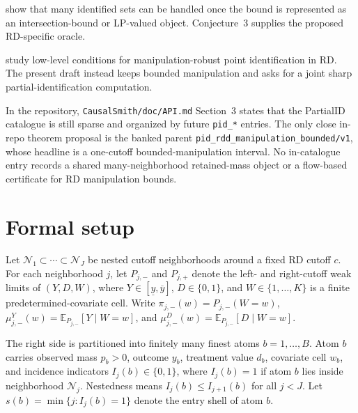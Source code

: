 \documentclass[11pt]{article}
\newcommand{\E}{\mathbb{E}}
\theoremstyle{definition}
\theoremstyle{plain}
\theoremstyle{remark}
\begin{document}
\citet[Abstract; p.~667]{chernozhukov_lee_rosen_2013_intersection_bounds} show that many
identified sets can be handled once the bound is represented as an intersection-bound or LP-valued
object. Conjecture~3 supplies the proposed RD-specific oracle.

\citet{ishihara_sawada_2024_manipulation_robust} study low-level conditions for manipulation-robust
point identification in RD. The present draft instead keeps bounded manipulation and asks for a
joint sharp partial-identification computation.

In the repository, \texttt{CausalSmith/doc/API.md} Section~3 states that the PartialID catalogue
is still sparse and organized by future \texttt{pid\_*} entries. The only close in-repo theorem
proposal is the banked parent \texttt{pid\_rdd\_manipulation\_bounded/v1}, whose headline is a
one-cutoff bounded-manipulation interval. No in-catalogue entry records a shared many-neighborhood
retained-mass object or a flow-based certificate for RD manipulation bounds.

\section{Formal setup}
Let \(\mathcal N_1\subset\cdots\subset\mathcal N_J\) be nested cutoff neighborhoods around a
fixed RD cutoff \(c\). For each neighborhood \(j\), let \(P_{j,-}\) and \(P_{j,+}\) denote the
left- and right-cutoff weak limits of \((Y,D,W)\), where \(Y\in[\underline y,\overline y]\),
\(D\in\{0,1\}\), and \(W\in\{1,\ldots,K\}\) is a finite predetermined-covariate cell. Write
\(\pi_{j,-}(w)=P_{j,-}(W=w)\),
\(\mu^Y_{j,-}(w)=\E_{P_{j,-}}[Y\mid W=w]\),
and \(\mu^D_{j,-}(w)=\E_{P_{j,-}}[D\mid W=w]\).

The right side is partitioned into finitely many finest atoms \(b=1,\ldots,B\). Atom \(b\)
carries observed mass \(p_b>0\), outcome \(y_b\), treatment value \(d_b\), covariate cell
\(w_b\), and incidence indicators \(I_j(b)\in\{0,1\}\), where \(I_j(b)=1\) if atom \(b\) lies
inside neighborhood \(\mathcal N_j\). Nestedness means \(I_j(b)\le I_{j+1}(b)\) for all
\(j<J\). Let \(s(b)=\min\{j:I_j(b)=1\}\) denote the entry shell of atom \(b\).
\end{document}
